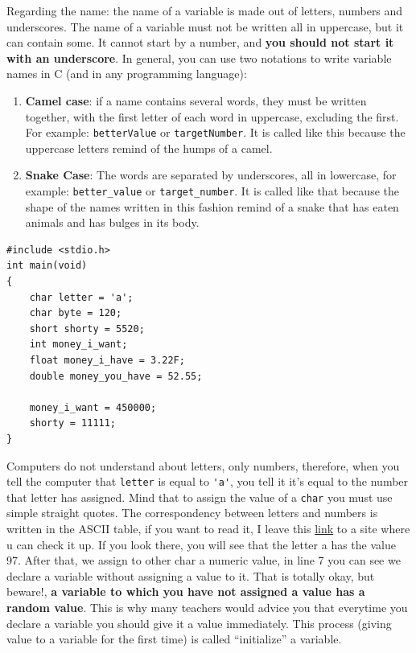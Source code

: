 \documentclass[a4paper]{article}
\begin{document}
Regarding the name: the name of a variable is made out of letters, numbers and
underscores. The name of a variable must not be written all in uppercase, but
it can contain some. It cannot start by a number, and \textbf{you should not start
it with an underscore}. In general, you can use two notations to write variable
names in C (and in any programming language):
\begin{enumerate}
    \item \textbf{Camel case}: if a name contains several words, they must be
    written together, with the first letter of each word in uppercase,
    excluding the first. For example: \verb!betterValue! or \verb!targetNumber!.
    It is called like this
    because the uppercase letters remind of the humps of a camel.
    \item \textbf{Snake Case}: The words are separated by underscores, all in
    lowercase, for example:  \texttt{better\_value} or \texttt{target\_number}. It is
    called like that because the shape of the names written in this fashion
    remind of a snake that has eaten animals and has bulges in its body.
\end{enumerate}

\noindent
\begin{minipage}[H]{\linewidth}
\mbox{}
\begin{lstlisting}[style=C, caption={Declaration and assignment of variables},
label={lst:variableAsignation}]
#include <stdio.h>
int main(void)
{
    char letter = 'a';
    char byte = 120;
    short shorty = 5520;
    int money_i_want;
    float money_i_have = 3.22F;
    double money_you_have = 52.55;

    money_i_want = 450000;
    shorty = 11111;
}
\end{lstlisting}
\end{minipage}

Computers do not understand about letters, only numbers, therefore, when you
tell the computer that \verb!letter! is equal to \verb!'a'!, you tell it it's
equal to the number that letter has assigned. Mind that to assign the value
of a \verb!char! you must use simple straight quotes. The correspondency between
letters and numbers is written in the ASCII table, if you want to read it, I
leave this \href{https://www.ascii-code.com/}{link} to a site where u can
check it up. If you look there, you will see that the letter a has the value
97. After that, we assign to other char a numeric value, in line 7 you can see
we declare a variable without assigning a value to it. That is totally okay, but
beware!, \textbf{a variable to which you have not assigned a value has a random
value}. This is why many teachers would advice you that everytime you declare a
variable you should give it a value immediately. This process (giving value to
a variable for the first time) is called ``initialize'' a variable.
\end{document}
